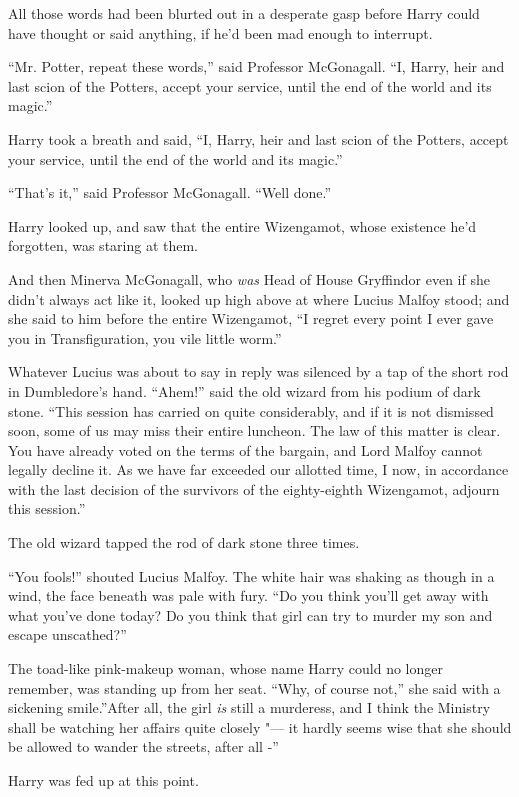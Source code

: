 All those words had been blurted out in a desperate gasp before Harry
could have thought or said anything, if he'd been mad enough to
interrupt.

``Mr. Potter, repeat these words,'' said Professor McGonagall. ``I,
Harry, heir and last scion of the Potters, accept your service, until
the end of the world and its magic.''

Harry took a breath and said, ``I, Harry, heir and last scion of the
Potters, accept your service, until the end of the world and its
magic.''

``That's it,'' said Professor McGonagall. ``Well done.''

Harry looked up, and saw that the entire Wizengamot, whose existence
he'd forgotten, was staring at them.

And then Minerva McGonagall, who \emph{was} Head of House Gryffindor
even if she didn't always act like it, looked up high above at where
Lucius Malfoy stood; and she said to him before the entire Wizengamot,
``I regret every point I ever gave you in Transfiguration, you vile
little worm.''

Whatever Lucius was about to say in reply was silenced by a tap of the
short rod in Dumbledore's hand. ``Ahem!'' said the old wizard from his
podium of dark stone. ``This session has carried on quite considerably,
and if it is not dismissed soon, some of us may miss their entire
luncheon. The law of this matter is clear. You have already voted on the
terms of the bargain, and Lord Malfoy cannot legally decline it. As we
have far exceeded our allotted time, I now, in accordance with the last
decision of the survivors of the eighty-eighth Wizengamot, adjourn this
session.''

The old wizard tapped the rod of dark stone three times.

``You fools!'' shouted Lucius Malfoy. The white hair was shaking as
though in a wind, the face beneath was pale with fury. ``Do you think
you'll get away with what you've done today? Do you think that girl can
try to murder my son and escape unscathed?''

The toad-like pink-makeup woman, whose name Harry could no longer
remember, was standing up from her seat. ``Why, of course not,'' she
said with a sickening smile.''After all, the girl \emph{is} still a
murderess, and I think the Ministry shall be watching her affairs quite
closely "--- it hardly seems wise that she should be allowed to wander the
streets, after all -''

Harry was fed up at this point.

